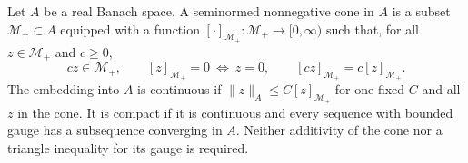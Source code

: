 Let $A$ be a real Banach space. A seminormed nonnegative cone in $A$ is a subset $\mathcal M_+\subset A$ equipped with a function $[\cdot]_{\mathcal M_+}:\mathcal M_+\to[0,\infty)$ such that, for all $z\in\mathcal M_+$ and $c\ge0$,
\[
c z\in\mathcal M_+,
\qquad [z]_{\mathcal M_+}=0\ \Longleftrightarrow\ z=0,
\qquad [cz]_{\mathcal M_+}=c[z]_{\mathcal M_+}.
\]
The embedding into $A$ is continuous if $\|z\|_A\le C[z]_{\mathcal M_+}$ for one fixed $C$ and all $z$ in the cone.
It is compact if it is continuous and every sequence with bounded gauge has a subsequence converging in $A$.
Neither additivity of the cone nor a triangle inequality for its gauge is required.